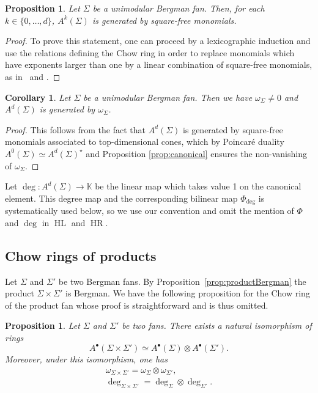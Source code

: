 \documentclass[11pt]{amsart}
\newtheorem{prop}[thm]{Proposition}
\newtheorem{cor}[thm]{Corollary}
\theoremstyle{definition}
\numberwithin{equation}{section}
\renewcommand{\~}{\widetilde}
\newcommand{\bul}{\bullet} %
\DeclareMathOperator{\HR}{HR} %
\DeclareMathOperator{\HL}{HL} %
\newcommand{\corps}{\mathbb K} %
\newcommand{\dual}{\star} %
\begin{document}
\begin{prop}
Let $\Sigma$ be a unimodular Bergman fan. Then, for each $k\in\{0,\dots,d\}$, $A^k(\Sigma)$ is generated by square-free monomials.
\end{prop}
\begin{proof}
To prove this statement, one can proceed by a lexicographic induction and use the relations defining the Chow ring in order to replace monomials which have exponents larger than one by a linear combination of square-free monomials, as in~\cite{AHK} and \cite{Ami}.
\end{proof}

\begin{cor}\label{prop:non-vanishing} Let $\Sigma$ be a unimodular Bergman fan. Then we have $\omega_\Sigma \neq 0$ and $A^d(\Sigma)$ is generated by $\omega_\Sigma$.
\end{cor}
\begin{proof} This follows from the fact that $A^d(\Sigma)$ is generated by square-free monomials associated to top-dimensional cones, which by Poincar\'e duality $A^0(\Sigma) \simeq A^{d}(\Sigma)^\dual$ and Proposition \ref{prop:canonical} ensures the non-vanishing of $\omega_\Sigma$.
\end{proof}

\medskip

Let $\deg\colon A^d(\Sigma)\to\corps$ be the linear map which takes value 1 on the canonical element. This degree map and the corresponding bilinear map $\Phi_{\deg}$ is systematically used below, so we use our convention and omit the mention of $\Phi$ and $\deg$ in $\HL$ and $\HR$.



\subsection{Chow rings of products} Let $\Sigma$ and $\Sigma'$ be two Bergman fans. By Proposition~\ref{prop:productBergman} the product $\Sigma \times \Sigma'$ is Bergman. We have the following proposition for the Chow ring of the product fan whose proof is straightforward and is thus omitted.

\begin{prop} \label{prop:cartesian_product}
Let $\Sigma$ and $\Sigma'$ be two fans. There exists a natural isomorphism of rings
\[ A^\bul(\Sigma\times\Sigma')\simeq A^\bul(\Sigma)\otimes A^\bul(\Sigma'). \]
Moreover, under this isomorphism, one has
\begin{gather*}
\omega_{\Sigma\times\Sigma'}=\omega_\Sigma\otimes\omega_{\Sigma'}, \\
\deg_{\Sigma\times\Sigma'}=\deg_\Sigma\otimes\deg_{\Sigma'}.
\end{gather*}
\end{prop}
\end{document}
